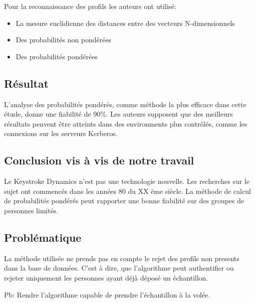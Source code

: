 Pour la reconnaissance des profils les auteurs ont utilisé:
\begin{itemize}
\item La mesure euclidienne des distances entre des vecteurs N-dimensionnels
\item Des probabilités non pondérées
\item Des probabilités pondérées
\end{itemize}

\subsection{Résultat}
L’analyse des probabilités pondérés, comme méthode la plus efficace dans cette étude, donne une fiabilité de 90\%. Les auteurs supposent que des meilleurs résultats peuvent être atteints dans des environments plus contrôlés, comme les connexions sur les serveurs Kerberos.


\subsection{Conclusion vis à vis de notre travail}
Le Keystroke Dynamics n’est pas une technologie nouvelle. Les recherches sur le sujet ont commencés dans les années 80 du XX ème siècle.
La méthode de calcul de probabilités pondérés peut rapporter une bonne fiabilité sur des groupes de personnes limités.

\subsection{Problématique}
La méthode utilisée ne prends pas en compte le rejet des profils non presents dans la base de données. C’est à dire, que l’algorithme peut authentifier ou rejeter uniquement les personnes ayant déjà déposé un échantillon.

Pb: Rendre l’algorithme capable de prendre l’échantillon à la volée.
